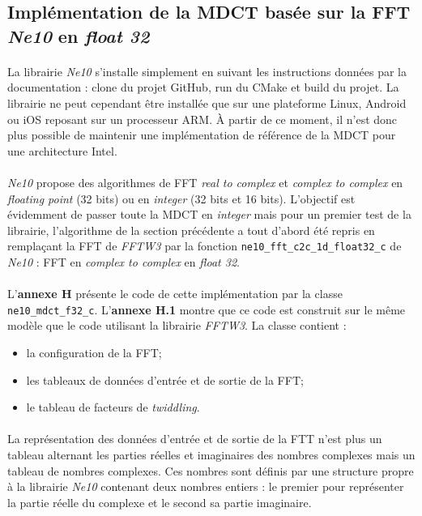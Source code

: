 \documentclass{article}
\begin{document}
    \subsection{Implémentation de la MDCT basée sur la FFT \emph{Ne10} en \emph{float 32}}
    \paragraph{}
    La librairie \emph{Ne10} s'installe simplement en suivant les instructions données par la documentation : clone du projet GitHub, run du CMake et build du projet\cite{Ne10}. La librairie ne peut cependant être installée que sur une plateforme Linux, Android ou iOS reposant sur un processeur ARM. À partir de ce moment, il n'est donc plus possible de maintenir une implémentation de référence de la MDCT pour une architecture Intel.

    \paragraph{}
    \emph{Ne10} propose des algorithmes de FFT \emph{real to complex} et \emph{complex to complex} en \emph{floating point} (32 bits) ou en \emph{integer} (32 bits et 16 bits). L'objectif est évidemment de passer toute la MDCT en \emph{integer} mais pour un premier test de la librairie, l'algorithme de la section précédente a tout d'abord été repris en remplaçant la FFT de \emph{FFTW3} par la fonction \texttt{ne10\_fft\_c2c\_1d\_float32\_c} de \emph{Ne10} : FFT en \emph{complex to complex} en \emph{float 32}.

    \paragraph{}
    L'\textbf{annexe H} présente le code de cette implémentation par la classe \texttt{ne10\_mdct\_f32\_c}. L'\textbf{annexe H.1} montre que ce code est construit sur le même modèle que le code utilisant la librairie \emph{FFTW3}. La classe contient :
    \begin{itemize}
        \item la configuration de la FFT;
        \item les tableaux de données d'entrée et de sortie de la FFT;
        \item le tableau de facteurs de \emph{twiddling}.
    \end{itemize}

    \paragraph{}
    La représentation des données d'entrée et de sortie de la FTT n'est plus un tableau alternant les parties réelles et imaginaires des nombres complexes mais un tableau de nombres complexes. Ces nombres sont définis par une structure propre à la librairie \emph{Ne10} contenant deux nombres entiers : le premier pour représenter la partie réelle du complexe et le second sa partie imaginaire.
\end{document}
